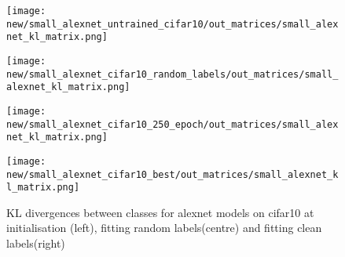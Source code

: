 \documentclass{article}
\begin{document}
            \begin{figure}[H]
                \centering
                \begin{minipage}{0.25\textwidth}
                    \centering
                    \texttt{[image: new/small\_alexnet\_untrained\_cifar10/out\_matrices/small\_alexnet\_kl\_matrix.png]}
                \end{minipage}%
                \hfill
                \begin{minipage}{0.25\textwidth}
                    \centering
                    \texttt{[image: new/small\_alexnet\_cifar10\_random\_labels/out\_matrices/small\_alexnet\_kl\_matrix.png]}
                \end{minipage}%
                \hfill
                \begin{minipage}{0.25\textwidth}
                    \centering
                    \texttt{[image: new/small\_alexnet\_cifar10\_250\_epoch/out\_matrices/small\_alexnet\_kl\_matrix.png]}
                \end{minipage}%
                \hfill
                \begin{minipage}{0.25\textwidth}
                    \centering
                    \texttt{[image: new/small\_alexnet\_cifar10\_best/out\_matrices/small\_alexnet\_kl\_matrix.png]}
                \end{minipage}
                \caption{KL divergences between classes for alexnet models on cifar10 at initialisation (left), fitting random labels(centre) and fitting clean labels(right)}
                \label{fig:cross_kl_divergence_small_alexnet}
            \end{figure}
        
        
            
\end{document}
